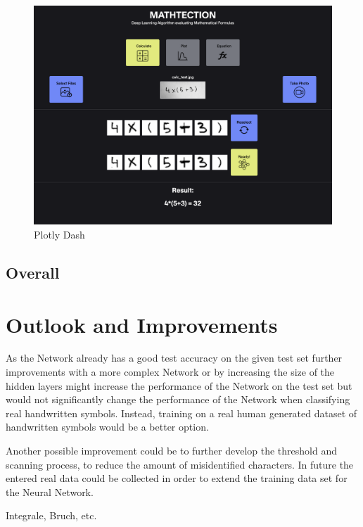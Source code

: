 \documentclass[@CLASSOPTIONS@]{tumarticle}
\begin{document}
\begin{figure}
    \begin{minipage}{0.48\textwidth}
     \centering
     \includegraphics[width=.9\linewidth]{figures/dash}
     \caption{Plotly Dash}\label{Fig:Dash}
   \end{minipage}
\end{figure}

\subsection{Overall}

\section{Outlook and Improvements}

As the Network already has a good test accuracy on the given test set further improvements with a more complex Network
or by increasing the size of the hidden layers might increase the performance of the Network on the test set but would
not significantly change the performance of the Network when classifying real handwritten symbols.
Instead, training on a real human generated dataset of handwritten symbols would be a better option.

Another possible improvement could be to further develop the threshold and scanning process,
to reduce the amount of misidentified characters.
In future the entered real data could be collected in order to extend the training data set for the
Neural Network.

Integrale, Bruch, etc.
\end{document}
